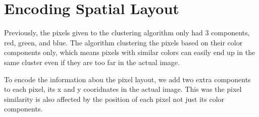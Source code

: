 \documentclass{article}
\begin{document}
	
	\section{Encoding Spatial Layout}
	Previously, the pixels given to the clustering algorithm only had 3 components, red, green, and blue. The algorithm clustering the pixels based on their color components only, which means pixels with similar colors can easily end up in the same cluster even if they are too far in the actual image.
	
	To encode the information abou the pixel layout, we add two extra components to each pixel, its x and y cooridnates in the actual image. This was the pixel similarity is also affected by the position of each pixel not just its color components.
	
	
	
\end{document}
